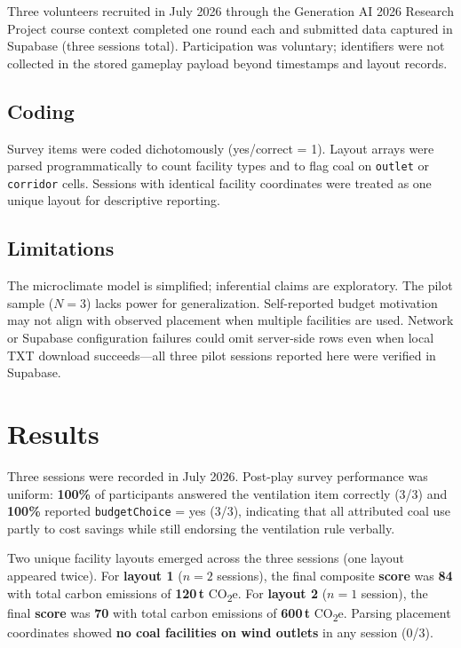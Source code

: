 \documentclass[stu, 12pt, apacite]{apa7}
\begin{document}
Three volunteers recruited in July 2026 through the Generation AI 2026 Research Project course context completed one round each and submitted data captured in Supabase (three sessions total). Participation was voluntary; identifiers were not collected in the stored gameplay payload beyond timestamps and layout records.

\subsection{Coding}

Survey items were coded dichotomously (yes/correct = 1). Layout arrays were parsed programmatically to count facility types and to flag coal on \texttt{outlet} or \texttt{corridor} cells. Sessions with identical facility coordinates were treated as one unique layout for descriptive reporting.

\subsection{Limitations}

The microclimate model is simplified; inferential claims are exploratory. The pilot sample ($N = 3$) lacks power for generalization. Self-reported budget motivation may not align with observed placement when multiple facilities are used. Network or Supabase configuration failures could omit server-side rows even when local TXT download succeeds---all three pilot sessions reported here were verified in Supabase.

\section{Results}

Three sessions were recorded in July 2026. Post-play survey performance was uniform: \textbf{100\%} of participants answered the ventilation item correctly (3/3) and \textbf{100\%} reported \texttt{budgetChoice} = yes (3/3), indicating that all attributed coal use partly to cost savings while still endorsing the ventilation rule verbally.

Two unique facility layouts emerged across the three sessions (one layout appeared twice). For \textbf{layout 1} ($n = 2$ sessions), the final composite \textbf{score} was \textbf{84} with total carbon emissions of \textbf{120\,t} CO\textsubscript{2}e. For \textbf{layout 2} ($n = 1$ session), the final \textbf{score} was \textbf{70} with total carbon emissions of \textbf{600\,t} CO\textsubscript{2}e. Parsing placement coordinates showed \textbf{no coal facilities on wind outlets} in any session (0/3).
\end{document}
